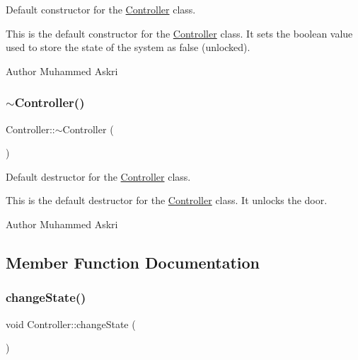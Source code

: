 Default constructor for the \hyperlink{classController}{Controller} class. 

This is the default constructor for the \hyperlink{classController}{Controller} class. It sets the boolean value used to store the state of the system as false (unlocked).

\begin{DoxyAuthor}{Author}
Muhammed Askri 
\end{DoxyAuthor}
\mbox{\label{classController_a0ab87934c4f7a266cfdb86e0f36bc1b5}} 
\subsubsection{\texorpdfstring{$\sim$\+Controller()}{~Controller()}}
{\footnotesize\ttfamily Controller\+::$\sim$\+Controller (\begin{DoxyParamCaption}{ }\end{DoxyParamCaption})}



Default destructor for the \hyperlink{classController}{Controller} class. 

This is the default destructor for the \hyperlink{classController}{Controller} class. It unlocks the door.

\begin{DoxyAuthor}{Author}
Muhammed Askri 
\end{DoxyAuthor}


\subsection{Member Function Documentation}
\mbox{\label{classController_a783956d7ffd422c814c8d62926c38f5c}} 
\subsubsection{\texorpdfstring{change\+State()}{changeState()}}
{\footnotesize\ttfamily void Controller\+::change\+State (\begin{DoxyParamCaption}{ }\end{DoxyParamCaption})\hspace{0.3cm}{\ttfamily [private]}}



